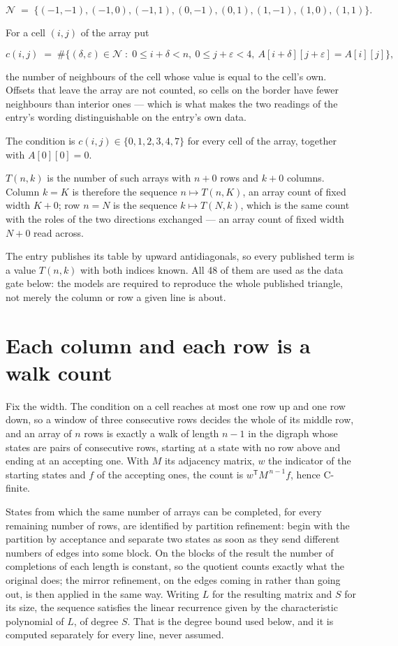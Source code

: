 \documentclass[11pt]{article}
\theoremstyle{definition}
\begin{document}
\[\mathcal{N} \;=\; \{(-1,-1), (-1,0), (-1,1), (0,-1), (0,1), (1,-1), (1,0), (1,1)\}.\]

For a cell $(i,j)$ of the array put

\[c(i,j) \;=\; \#\bigl\{(\delta,\varepsilon)\in\mathcal{N} \;:\; 0\le i+\delta<n,\ 0\le j+\varepsilon<4,\ A[i+\delta][j+\varepsilon] = A[i][j]\bigr\},\]

the number of neighbours of the cell whose value is equal to the cell's own. Offsets that leave the array are not counted, so cells on the border have fewer neighbours than interior ones --- which is what makes the two readings of the entry's wording distinguishable on the entry's own data.

The condition is $c(i,j) \in \{0, 1, 2, 3, 4, 7\}$ for every cell of the array, together with $A[0][0]=0$.

$T(n,k)$ is the number of such arrays with $n + 0$ rows and $k + 0$ columns. Column $k = K$ is therefore the sequence $n \mapsto T(n,K)$, an array count of fixed width $K + 0$; row $n = N$ is the sequence $k \mapsto T(N,k)$, which is the same count with the roles of the two directions exchanged --- an array count of fixed width $N + 0$ read across.

The entry publishes its table by upward antidiagonals, so every published term is a value $T(n,k)$ with both indices known. All 48 of them are used as the data gate below: the models are required to reproduce the whole published triangle, not merely the column or row a given line is about.

\section{Each column and each row is a walk count}

Fix the width. The condition on a cell reaches at most one row up and one row down, so a window of three consecutive rows decides the whole of its middle row, and an array of $n$ rows is exactly a walk of length $n-1$ in the digraph whose states are pairs of consecutive rows, starting at a state with no row above and ending at an accepting one. With $M$ its adjacency matrix, $w$ the indicator of the starting states and $f$ of the accepting ones, the count is $w^{\mathsf T}M^{\,n-1}f$, hence C-finite.

States from which the same number of arrays can be completed, for every remaining number of rows, are identified by partition refinement: begin with the partition by acceptance and separate two states as soon as they send different numbers of edges into some block. On the blocks of the result the number of completions of each length is constant, so the quotient counts exactly what the original does; the mirror refinement, on the edges coming in rather than going out, is then applied in the same way. Writing $L$ for the resulting matrix and $S$ for its size, the sequence satisfies the linear recurrence given by the characteristic polynomial of $L$, of degree $S$. That is the degree bound used below, and it is computed separately for every line, never assumed.
\end{document}
